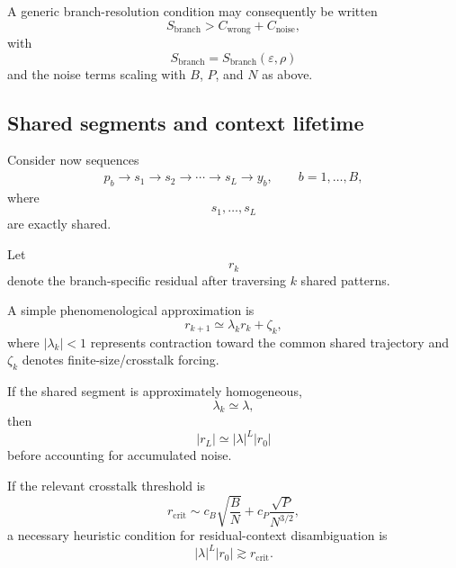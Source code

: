 A generic branch-resolution condition may consequently be written
\begin{equation}
S_{\mathrm{branch}}
>
C_{\mathrm{wrong}}
+
C_{\mathrm{noise}},
\label{eq:generic-snr-condition}
\end{equation}
with
\begin{equation}
S_{\mathrm{branch}}
=
S_{\mathrm{branch}}
\left(
\varepsilon,
\rho
\right)
\end{equation}
and the noise terms scaling with $B$, $P$, and $N$ as above.

\subsection{Shared segments and context lifetime}

Consider now sequences
\begin{align}
p_b
\rightarrow
s_1
\rightarrow
s_2
\rightarrow\cdots\rightarrow
s_L
\rightarrow
y_b,
\qquad b=1,\ldots,B,
\end{align}
where
\begin{equation}
s_1,\ldots,s_L
\end{equation}
are exactly shared.

Let
\begin{equation}
r_k
\end{equation}
denote the branch-specific residual after traversing $k$ shared patterns.

A simple phenomenological approximation is
\begin{equation}
r_{k+1}
\simeq
\lambda_k r_k+\zeta_k,
\end{equation}
where $|\lambda_k|<1$ represents contraction toward the common shared
trajectory and $\zeta_k$ denotes finite-size/crosstalk forcing.

If the shared segment is approximately homogeneous,
\begin{equation}
\lambda_k\simeq\lambda,
\end{equation}
then
\begin{equation}
|r_L|
\simeq
|\lambda|^L |r_0|
\end{equation}
before accounting for accumulated noise.

If the relevant crosstalk threshold is
\begin{equation}
r_{\mathrm{crit}}
\sim
c_B\sqrt{\frac{B}{N}}
+
c_P\frac{\sqrt P}{N^{3/2}},
\end{equation}
a necessary heuristic condition for residual-context disambiguation is
\begin{equation}
|\lambda|^L |r_0|
\gtrsim
r_{\mathrm{crit}}.
\label{eq:context-lifetime}
\end{equation}

